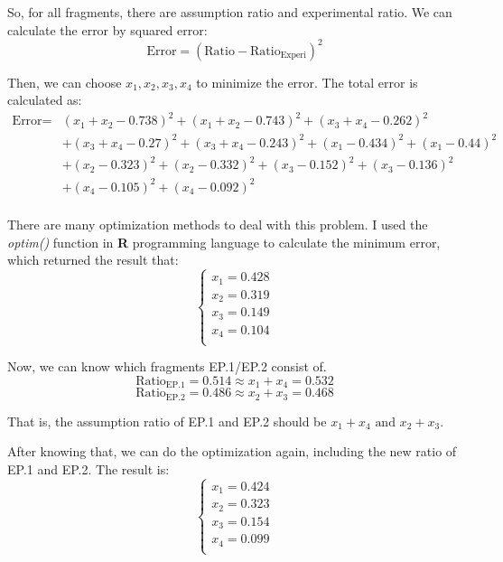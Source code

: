 \documentclass{article}
\begin{document}
            So, for all fragments, there are assumption ratio and experimental ratio. We can calculate the error by squared error:
            $$\text{Error} = (\text{Ratio} - \text{Ratio}_{\text{Experi}})^2$$

            Then, we can choose $x_1, x_2, x_3, x_4$ to minimize the error. The total error is calculated as:
            $$\begin{aligned}
            \text{Error} = &(x_1 + x_2 - 0.738) ^ 2 + (x_1 + x_2 - 0.743) ^ 2 + (x_3 + x_4 - 0.262) ^ 2\\
            &+(x_3 + x_4 - 0.27) ^ 2 + (x_3 + x_4 - 0.243) ^ 2 + (x_1 - 0.434)^2 + (x_1 - 0.44)^2\\
            &+(x_2 - 0.323)^2 + (x_2 - 0.332)^2 + (x_3 - 0.152)^2 + (x_3 - 0.136)^2\\
            &+(x_4 - 0.105)^2 + (x_4 - 0.092)^2\\
            \end{aligned}$$

            There are many optimization methods to deal with this problem. I used the \textit{optim()} function in \textbf{R} programming language to calculate the minimum error, which returned the result that:
            $$\left\{\begin{aligned}
            x_1 = 0.428\\
            x_2 = 0.319\\
            x_3 = 0.149\\
            x_4 = 0.104\\
            \end{aligned}\right.$$

            Now, we can know which fragments EP.1/EP.2 consist of.
            $$\text{Ratio}_{\text{EP.1}} = 0.514 \approx x_1 + x_4 = 0.532$$
            $$\text{Ratio}_{\text{EP.2}} = 0.486 \approx x_2 + x_3 = 0.468$$

            That is, the assumption ratio of EP.1 and EP.2 should be $x_1 + x_4 \text{ and } x_2 + x_3$.

            After knowing that, we can do the optimization again, including the new ratio of EP.1 and EP.2.
            The result is:
            $$\left\{\begin{aligned}
            x_1 = 0.424\\
            x_2 = 0.323\\
            x_3 = 0.154\\
            x_4 = 0.099\\
            \end{aligned}\right.$$
\end{document}
